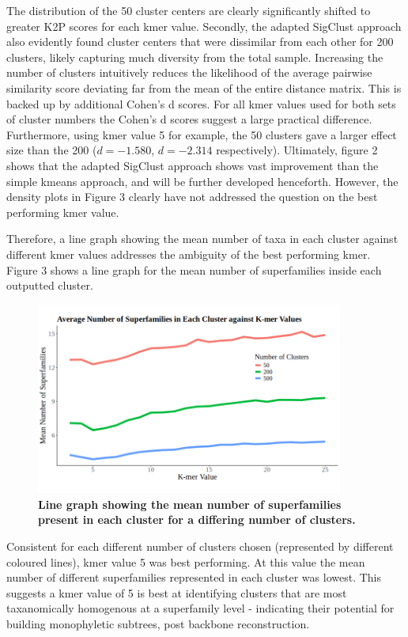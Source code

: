 \documentclass[12pt]{article}
\begin{document}
  The distribution of the 50 cluster centers are clearly significantly shifted to greater K2P scores for each kmer value. Secondly, the adapted SigClust approach also evidently found cluster centers that were dissimilar from each other for 200 clusters, likely capturing much diversity from the total sample. Increasing the number of clusters intuitively reduces the likelihood of the average pairwise similarity score deviating far from the mean of the entire distance matrix. This is backed up by additional Cohen's d scores. For all kmer values used for both sets of cluster numbers the Cohen's d scores suggest a large practical difference. Furthermore, using kmer value 5 for example, the 50 clusters gave a larger effect size than the 200 ($d = -1.580$, $d = -2.314$ respectively). Ultimately, figure 2 shows that the adapted SigClust approach shows vast improvement than the simple kmeans approach, and will be further developed henceforth. However, the density plots in Figure 3 clearly have not addressed the question on the best performing kmer value.

  Therefore, a line graph showing the mean number of taxa in each cluster against different kmer values addresses the ambiguity of the best performing kmer. Figure 3 shows a line graph for the mean number of superfamilies inside each outputted cluster. 

  \begin{figure}[H]
    \centering
    \includegraphics[width=0.9\textwidth]{Av_Super.png}
    \captionsetup{margin=0.75cm}
      \caption{\textbf{\small Line graph showing the mean number of superfamilies present in each cluster for a differing number of clusters.}}
\end{figure}

  Consistent for each different number of clusters chosen (represented by different coloured lines), kmer value 5 was best performing. At this value the mean number of different superfamilies represented in each cluster was lowest. This suggests a kmer value of 5 is best at identifying clusters that are most taxanomically homogenous at a superfamily level - indicating their potential for building monophyletic subtrees, post backbone reconstruction.
\end{document}
